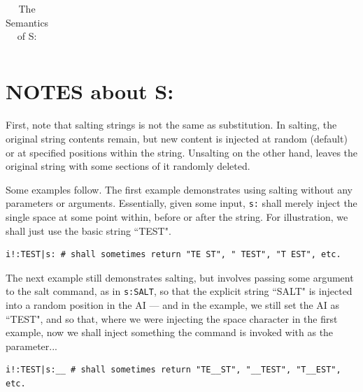 \documentclass[a4paper, 18pt]{book} %
\begin{document}
{{{\begin{table}[H]
\begin{tabular}{>{\bfseries}m{0.4\linewidth} | m{0.6\linewidth}}
 \hline
\end{tabular}
\caption{The Semantics of S:}
\label{TABSEMS}
\end{table}


\section{NOTES about S:}
\label{SECNOTES}
  
First, note that salting strings is not the same as substitution. In salting, the original string contents remain, but new content is injected at random (default) or at specified positions within the string. Unsalting on the other hand, leaves the original string with some sections of it randomly deleted. 


\vspace{2em}


Some examples follow. The first example demonstrates using salting without any parameters or arguments. Essentially, given some input, \texttt{s:} shall merely inject the single space at some point within, before or after the string. For illustration, we shall just use the basic string ``TEST".

\vspace{1em}

  \begin{tcolorbox}[teaterminalstyle, title=S: EXAMPLE 1: Salting using S:, breakable]
  \begin{lstlisting}[language=TEA,breaklines=true,]
i!:TEST|s: # shall sometimes return "TE ST", " TEST", "T EST", etc.
   \end{lstlisting}
  \end{tcolorbox}

\vspace{1em}

The next example still demonstrates salting, but involves passing some argument to the salt command, as in \texttt{s:SALT}, so that the explicit string ``SALT" is injected into a random position in the AI --- and in the example, we still set the AI as ``TEST", and so that, where we were injecting the space character in the first example, now we shall inject something the command is invoked with as the parameter...

\vspace{1em}

  \begin{tcolorbox}[teaterminalstyle, title=S: EXAMPLE 2: Salting using S:SALT, breakable]
  \begin{lstlisting}[language=TEA,breaklines=true,]
i!:TEST|s:__ # shall sometimes return "TE__ST", "__TEST", "T__EST", etc.
   \end{lstlisting}
  \end{tcolorbox}

}}}
\end{document}
